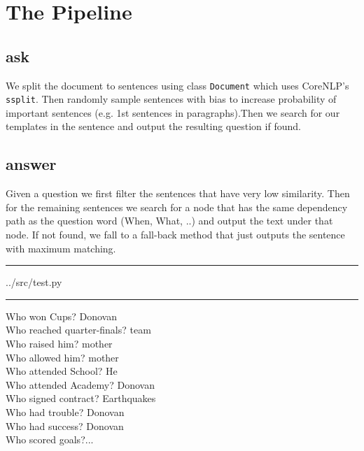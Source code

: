 \documentclass{article}
\newcommand{\code}[1] {
	\noindent\rule{\textwidth}{0.4pt}
	#1
	\vspace{-0.3em}
	\par\noindent\rule{\textwidth}{0.4pt}
	\vspace{-1.7\baselineskip}
	
}
\begin{document}
    \section{The Pipeline}
    \subsection{ask}
    We split the document to sentences using class \texttt{Document} which uses CoreNLP's
    \texttt{ssplit}. Then randomly sample sentences with bias to increase probability of important
    sentences (e.g. 1st sentences in paragraphs).Then we  search for our templates in the sentence
    and output the resulting question if found.

    \subsection{answer} Given a question we first filter the sentences that have very low
    similarity. Then for the remaining sentences we search for a node that has the same dependency
    path as the question word (When, What, ..) and output the text under that node. If not found, we
    fall to a fall-back method that just outputs the sentence with maximum matching. 

\code{../src/test.py}
Who won Cups? Donovan\\
Who reached quarter-finals? team\\
Who raised him? mother\\
Who allowed him? mother\\
Who attended School? He\\
Who attended Academy? Donovan\\
Who signed contract? Earthquakes\\
Who had trouble? Donovan\\
Who had success? Donovan\\
Who scored goals?...
    
\end{document}
